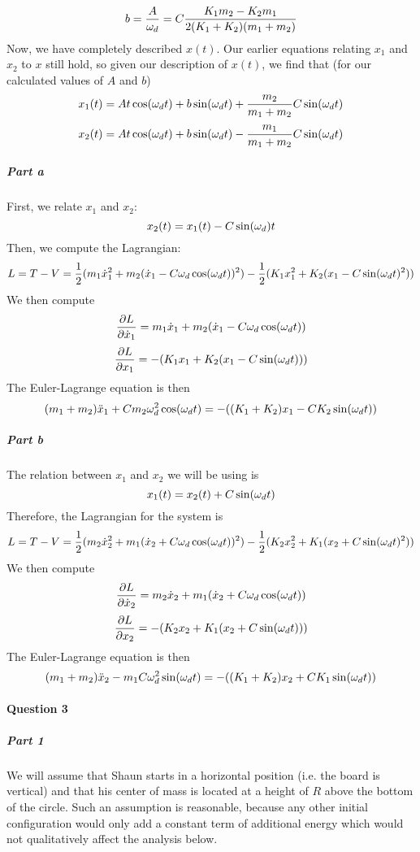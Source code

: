 $$b=\frac{A}{\omega_d}=C\frac{K_1 m_2-K_2 m_1}{2(K_1+K_2)(m_1+m_2)}$$
Now, we have completely described $x(t)$.  Our earlier equations relating $x_1$ and $x_2$ to $x$ still hold, so given our description of $x(t)$, we find that (for our calculated values of $A$ and $b$)
$$x_1(t)=At \cos(\omega_d t)+b\sin(\omega_d t)+\frac{m_2}{m_1+m_2} C\sin(\omega_d t)$$
$$x_2(t)=At\cos(\omega_d t)+b\sin(\omega_d t)-\frac{m_1}{m_1+m_2}C\sin(\omega_d t)$$
\subparagraph{Part a}  First, we relate $x_1$ and $x_2$:
$$x_2(t)= x_1(t)-C\sin(\omega_d) t$$
Then, we compute the Lagrangian:
$$L=T-V= \frac 1 2 (m_1 \dot x_1^2 + m_2 (\dot x_1 - C\omega_d \cos(\omega_d t))^2)-\frac 1 2 (K_1 x_1^2+K_2 (x_1-C \sin(\omega_d t)^2))$$
We then compute
$$\frac{\partial L}{\partial \dot x_1}= m_1 \dot x_1 + m_2 (\dot x_1 - C \omega_d \cos(\omega_d t))$$
$$\frac{\partial L}{\partial x_1}=-(K_1 x_1+K_2(x_1-C\sin (\omega_d t)))$$
The Euler-Lagrange equation is then 
$$  (m_1+m_2)\ddot x_1 + C m_2 \omega_d^2 \cos(\omega_d t)=-((K_1+K_2) x_1 - C K_2 \sin(\omega_d t))$$
\subparagraph{Part b}  The relation between $x_1$ and $x_2$ we will be using is
$$x_1(t)=x_2(t) + C\sin(\omega_d t)$$
Therefore, the Lagrangian for the system is 
$$L=T-V= \frac 1 2 (m_2 \dot x_2^2 + m_1 (\dot x_2 + C\omega_d \cos(\omega_d t))^2)-\frac 1 2 (K_2 x_2^2+K_1 (x_2+C \sin(\omega_d t)^2))$$
We then compute
$$\frac{\partial L}{\partial \dot x_2}= m_2 \dot x_2 + m_1 (\dot x_2+ C \omega_d \cos(\omega_d t))$$
$$\frac{\partial L}{\partial x_2}=-(K_2 x_2+K_1(x_2+C\sin (\omega_d t)))$$
The Euler-Lagrange equation is then
$$ (m_1+m_2) \ddot x_2-m_1 C \omega_d^2 \sin(\omega_d t)=-((K_1+K_2) x_2+C K_1 \sin(\omega_d t))$$

\paragraph{Question 3}
\subparagraph{Part 1}
We will assume that Shaun starts in a horizontal position (i.e. the board is vertical) and that his center of mass is located at a height of $R$ above the bottom of the circle. Such an assumption is reasonable, because any other initial configuration would only add a constant term of additional energy which would not qualitatively affect the analysis below.

